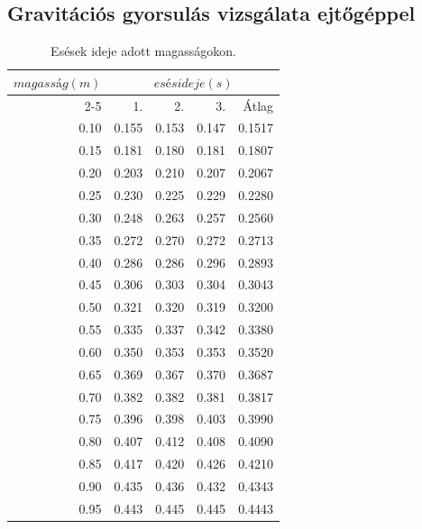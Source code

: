 \documentclass[10pt,pdftex]{report}
\begin{document}
\subsection*{Gravitációs gyorsulás vizsgálata ejtőgéppel}
\begin{table}[H]
    \centering
    \begin{tabular}{|r|r|r|r|r|}
        \hline
        \multirow[c]{2}{*}{$magasság(m)$} & \multicolumn{4}{|c|}{$esés ideje(s)$} \\
        \cline{2-5}
        & 1. & 2. & 3. & Átlag \\
        \hline
        0.10 & 0.155 & 0.153 & 0.147 & 0.1517 \\
        \hline
        0.15 & 0.181 & 0.180 & 0.181 & 0.1807 \\
        \hline
        0.20 & 0.203 & 0.210 & 0.207 & 0.2067 \\
        \hline
        0.25 & 0.230 & 0.225 & 0.229 & 0.2280 \\
        \hline
        0.30 & 0.248 & 0.263 & 0.257 & 0.2560 \\
        \hline
        0.35 & 0.272 & 0.270 & 0.272 & 0.2713 \\
        \hline
        0.40 & 0.286 & 0.286 & 0.296 & 0.2893 \\
        \hline
        0.45 & 0.306 & 0.303 & 0.304 & 0.3043 \\
        \hline
        0.50 & 0.321 & 0.320 & 0.319 & 0.3200 \\
        \hline
        0.55 & 0.335 & 0.337 & 0.342 & 0.3380 \\
        \hline
        0.60 & 0.350 & 0.353 & 0.353 & 0.3520 \\
        \hline
        0.65 & 0.369 & 0.367 & 0.370 & 0.3687 \\
        \hline
        0.70 & 0.382 & 0.382 & 0.381 & 0.3817 \\
        \hline
        0.75 & 0.396 & 0.398 & 0.403 & 0.3990 \\
        \hline
        0.80 & 0.407 & 0.412 & 0.408 & 0.4090 \\
        \hline
        0.85 & 0.417 & 0.420 & 0.426 & 0.4210 \\
        \hline
        0.90 & 0.435 & 0.436 & 0.432 & 0.4343 \\
        \hline
        0.95 & 0.443 & 0.445 & 0.445 & 0.4443 \\
        \hline
    \end{tabular}
    \caption{Esések ideje adott magasságokon.}
\end{table}
\end{document}
